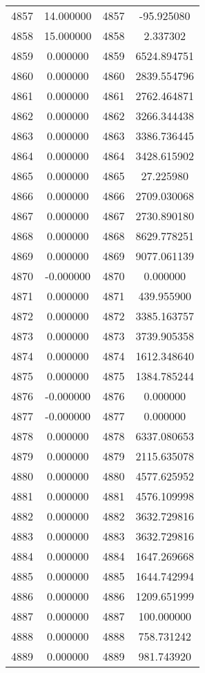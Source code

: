 \documentclass[12pt]{article}
\begin{document}
\begin{longtable}{@{}cccc@{}}
4857 & 14.000000 & 4857 & -95.925080 \\
4858 & 15.000000 & 4858 & 2.337302 \\
4859 & 0.000000 & 4859 & 6524.894751 \\
4860 & 0.000000 & 4860 & 2839.554796 \\
4861 & 0.000000 & 4861 & 2762.464871 \\
4862 & 0.000000 & 4862 & 3266.344438 \\
4863 & 0.000000 & 4863 & 3386.736445 \\
4864 & 0.000000 & 4864 & 3428.615902 \\
4865 & 0.000000 & 4865 & 27.225980 \\
4866 & 0.000000 & 4866 & 2709.030068 \\
4867 & 0.000000 & 4867 & 2730.890180 \\
4868 & 0.000000 & 4868 & 8629.778251 \\
4869 & 0.000000 & 4869 & 9077.061139 \\
4870 & -0.000000 & 4870 & 0.000000 \\
4871 & 0.000000 & 4871 & 439.955900 \\
4872 & 0.000000 & 4872 & 3385.163757 \\
4873 & 0.000000 & 4873 & 3739.905358 \\
4874 & 0.000000 & 4874 & 1612.348640 \\
4875 & 0.000000 & 4875 & 1384.785244 \\
4876 & -0.000000 & 4876 & 0.000000 \\
4877 & -0.000000 & 4877 & 0.000000 \\
4878 & 0.000000 & 4878 & 6337.080653 \\
4879 & 0.000000 & 4879 & 2115.635078 \\
4880 & 0.000000 & 4880 & 4577.625952 \\
4881 & 0.000000 & 4881 & 4576.109998 \\
4882 & 0.000000 & 4882 & 3632.729816 \\
4883 & 0.000000 & 4883 & 3632.729816 \\
4884 & 0.000000 & 4884 & 1647.269668 \\
4885 & 0.000000 & 4885 & 1644.742994 \\
4886 & 0.000000 & 4886 & 1209.651999 \\
4887 & 0.000000 & 4887 & 100.000000 \\
4888 & 0.000000 & 4888 & 758.731242 \\
4889 & 0.000000 & 4889 & 981.743920 \\

\end{longtable}
\end{document}
